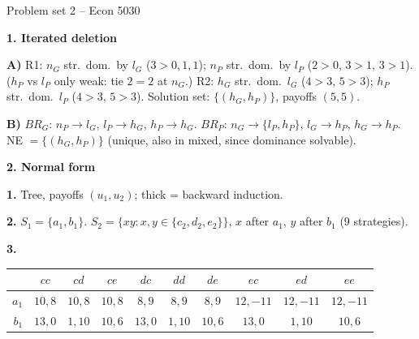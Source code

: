 \documentclass[12pt]{article}
\begin{document}
\begin{center}
{\large Problem set 2 -- Econ 5030}
\end{center}

\textbf{1. Iterated deletion}

\textbf{A)} R1: $n_G$ str.\ dom.\ by $l_G$ ($3>0,1,1$); $n_P$ str.\ dom.\ by $l_P$ ($2>0$, $3>1$, $3>1$). ($h_P$ vs $l_P$ only weak: tie $2=2$ at $n_G$.)
R2: $h_G$ str.\ dom.\ $l_G$ ($4>3$, $5>3$); $h_P$ str.\ dom.\ $l_P$ ($4>3$, $5>3$).
Solution set: $\{(h_G,h_P)\}$, payoffs $(5,5)$.

\textbf{B)} $BR_G$: $n_P\to l_G$, $l_P\to h_G$, $h_P\to h_G$. $BR_P$: $n_G\to\{l_P,h_P\}$, $l_G\to h_P$, $h_G\to h_P$. NE $=\{(h_G,h_P)\}$ (unique, also in mixed, since dominance solvable).

\medskip
\textbf{2. Normal form}

\textbf{1.} Tree, payoffs $(u_1,u_2)$; thick = backward induction.
\begin{center}
\end{center}

\textbf{2.} $S_1=\{a_1,b_1\}$. $S_2=\{xy: x,y\in\{c_2,d_2,e_2\}\}$, $x$ after $a_1$, $y$ after $b_1$ (9 strategies).

\textbf{3.}
\begin{center}
\small
\setlength{\tabcolsep}{3.5pt}
\begin{tabular}{r|ccccccccc}
 & $cc$ & $cd$ & $ce$ & $dc$ & $dd$ & $de$ & $ec$ & $ed$ & $ee$ \\ \hline
$a_1$ & $10,8$ & $10,8$ & $10,8$ & $8,9$ & $8,9$ & $8,9$ & $12,-11$ & $12,-11$ & $12,-11$ \\
$b_1$ & $13,0$ & $1,10$ & $10,6$ & $13,0$ & $1,10$ & $10,6$ & $13,0$ & $1,10$ & $10,6$
\end{tabular}
\end{center}
\end{document}
